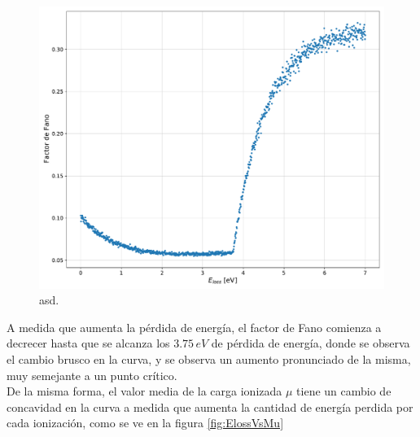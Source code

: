 \begin{figure}[h]
    \centering
    \includegraphics[scale=0.35]{Figs/Fano_vs_Eloss_5ktrials_0-7Eloss.pdf}
    \caption{\footnotesize{asd.}}
    \label{fig:FanoVsEloss}
\end{figure}
A medida que aumenta la pérdida de energía, el factor de Fano comienza a decrecer hasta que se alcanza los $3.75\,\si{eV}$ de pérdida de energía, donde se observa el cambio brusco en la curva, y se observa un aumento pronunciado de la misma, muy semejante a un punto crítico.\\
\indent De la misma forma, el valor media de la carga ionizada $\mu$ tiene un cambio de concavidad en la curva a medida que aumenta la cantidad de energía perdida por cada ionización, como se ve en la figura \ref{fig:ElossVsMu}

